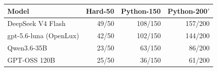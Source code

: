 \begin{tabular}{lrrr}
\toprule
\textbf{Model} & \textbf{Hard-50} & \textbf{Python-150} & \textbf{Python-200$'$} \\
\midrule
DeepSeek V4 Flash & 49/50 & 108/150 & 157/200 \\
gpt-5.6-luna (OpenLux) & 42/50 & 102/150 & 144/200 \\
Qwen3.6-35B & 23/50 & 63/150 & 86/200 \\
GPT-OSS 120B & 25/50 & 36/150 & 61/200 \\
\bottomrule
\end{tabular}
